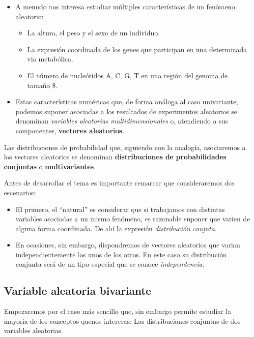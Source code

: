 \documentclass[
  a4paper,
  DIV=11,
  numbers=noendperiod]{scrreprt}
\providecommand{\tightlist}{%
  \setlength{\itemsep}{0pt}\setlength{\parskip}{0pt}}\usepackage{longtable,booktabs,array}
\begin{document}
\begin{itemize}
\item
  A menudo nos interesa estudiar múltiples características de un
  fenómeno aleatorio:

  \begin{itemize}
  \tightlist
  \item
    La altura, el peso y el sexo de un individuo.
  \item
    La expresión coordinada de los genes que participan en una
    determinada via metabólica.
  \item
    El número de nucleótidos A, C, G, T en una región del genoma de
    tamaño \n \$.
  \end{itemize}
\item
  Estas características numéricas que, de forma análoga al caso
  univariante, podemos suponer asociadas a los resultados de
  experimentos aleatorios se denominan \emph{variables aleatorias
  multidimensionales} o, atendiendo a sus componentes, \textbf{vectores
  aleatorios}.
\end{itemize}

Las distribuciones de probabilidad que, siguiendo con la analogía,
asociaremos a los vectores aleatorios se denominan
\textbf{distribuciones de probabilidades conjuntas} o
\textbf{multivariantes}.

Antes de desarrollar el tema es importante remarcar que consideraremos
dos escenarios:

\begin{itemize}
\item
  El primero, el ``natural'' es considerar que si trabajamos con
  distintas variables asociadas a un mismo fenómeno, es razonable
  suponer que varien de alguna forma coordinada. De ahí la expresión
  \emph{distribución conjnta}.
\item
  En ocasiones, sin embargo, dispondremos de vectores aleatorios que
  varian independientemente los unos de los otros. En este caso su
  distribución conjunta será de un tipo especial que se conoce
  \emph{independencia}.
\end{itemize}

\subsection{Variable aleatoria
bivariante}\label{variable-aleatoria-bivariante}

Empezaremos por el caso más sencillo que, sin embargo permite estudiar
la mayoría de los conceptos quenos interesas: Las distribuciones
conjuntas de dos variables aleatorias.
\end{document}
